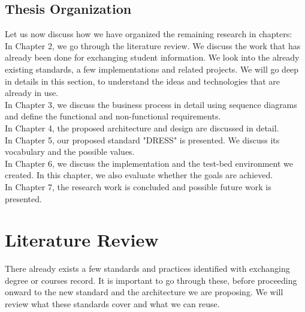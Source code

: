 \documentclass[12pt,a4paper,oneside]{book}
\begin{document}


\section{Thesis Organization}\label{s-thesis-organization}

Let us now discuss how we have organized the remaining research in chapters: \\

In Chapter 2, we go through the literature review. We discuss the work that has already been done for exchanging student information. We look into the already existing standards, a few implementations and related projects. We will go deep in details in this section, to understand the ideas and technologies that are already in use. \\

In Chapter 3, we discuss the business process in detail using sequence diagrams and define the functional and non-functional requirements.  \\

In Chapter 4, the proposed architecture and design are discussed in detail. \\

In Chapter 5, our proposed standard "DRESS" is presented. We discuss its vocabulary and the possible values. \\

In Chapter 6, we discuss the implementation and the test-bed environment we created. In this chapter, we also evaluate whether the goals are achieved. \\

In Chapter 7, the research work is concluded and possible future work is presented.

\chapter{Literature Review}\label{ch-work}

There already exists a few standards and practices identified with exchanging degree or courses record. It is important to go through these, before proceeding onward to the new standard and the architecture we are proposing. We will review what these standards cover and what we can reuse. 
\end{document}
